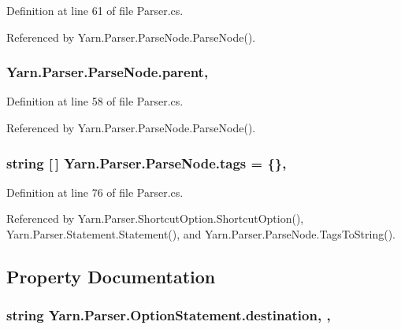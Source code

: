 Definition at line 61 of file Parser.\-cs.



Referenced by Yarn.\-Parser.\-Parse\-Node.\-Parse\-Node().

\hypertarget{a00138_af313a82103fcc2ff5a177dbb06b92f7b}{
\subsubsection[{parent}]{ Yarn.\-Parser.\-Parse\-Node.\-parent\hspace{0.3cm}{\ttfamily [package]}, {\ttfamily [inherited]}}}\label{a00138_af313a82103fcc2ff5a177dbb06b92f7b}


Definition at line 58 of file Parser.\-cs.



Referenced by Yarn.\-Parser.\-Parse\-Node.\-Parse\-Node().

\hypertarget{a00138_a58b3a15788fd2d4127d73619dc6d04ae}{
\subsubsection[{tags}]{\setlength{\rightskip}{0pt plus 5cm}string \mbox{[}$\,$\mbox{]} Yarn.\-Parser.\-Parse\-Node.\-tags = \{\}\hspace{0.3cm}{\ttfamily [package]}, {\ttfamily [inherited]}}}\label{a00138_a58b3a15788fd2d4127d73619dc6d04ae}


Definition at line 76 of file Parser.\-cs.



Referenced by Yarn.\-Parser.\-Shortcut\-Option.\-Shortcut\-Option(), Yarn.\-Parser.\-Statement.\-Statement(), and Yarn.\-Parser.\-Parse\-Node.\-Tags\-To\-String().



\subsection{Property Documentation}
\hypertarget{a00136_abbe56fba06169901508e6c659f06c236}{
\subsubsection[{destination}]{\setlength{\rightskip}{0pt plus 5cm}string Yarn.\-Parser.\-Option\-Statement.\-destination\hspace{0.3cm}{\ttfamily [get]}, {\ttfamily [set]}, {\ttfamily [package]}}}\label{a00136_abbe56fba06169901508e6c659f06c236}


